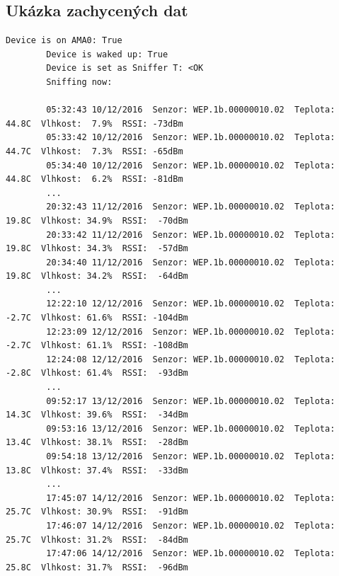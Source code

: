 \begin{landscape}
\chapter{Ukázka zachycených dat}
\label{PrilohaVystup}
	\begin{lstlisting}[style=MyCodeBash]
		Device is on AMA0: True
		Device is waked up: True
		Device is set as Sniffer T: <OK
		Sniffing now:

		05:32:43 10/12/2016  Senzor: WEP.1b.00000010.02  Teplota: 44.8C  Vlhkost:  7.9%  RSSI: -73dBm 
		05:33:42 10/12/2016  Senzor: WEP.1b.00000010.02  Teplota: 44.7C  Vlhkost:  7.3%  RSSI: -65dBm 
		05:34:40 10/12/2016  Senzor: WEP.1b.00000010.02  Teplota: 44.8C  Vlhkost:  6.2%  RSSI: -81dBm
		...
		20:32:43 11/12/2016  Senzor: WEP.1b.00000010.02  Teplota: 19.8C  Vlhkost: 34.9%  RSSI:  -70dBm
		20:33:42 11/12/2016  Senzor: WEP.1b.00000010.02  Teplota: 19.8C  Vlhkost: 34.3%  RSSI:  -57dBm
		20:34:40 11/12/2016  Senzor: WEP.1b.00000010.02  Teplota: 19.8C  Vlhkost: 34.2%  RSSI:  -64dBm
		...
		12:22:10 12/12/2016  Senzor: WEP.1b.00000010.02  Teplota: -2.7C  Vlhkost: 61.6%  RSSI: -104dBm
		12:23:09 12/12/2016  Senzor: WEP.1b.00000010.02  Teplota: -2.7C  Vlhkost: 61.1%  RSSI: -108dBm
		12:24:08 12/12/2016  Senzor: WEP.1b.00000010.02  Teplota: -2.8C  Vlhkost: 61.4%  RSSI:  -93dBm
		...
		09:52:17 13/12/2016  Senzor: WEP.1b.00000010.02  Teplota: 14.3C  Vlhkost: 39.6%  RSSI:  -34dBm
		09:53:16 13/12/2016  Senzor: WEP.1b.00000010.02  Teplota: 13.4C  Vlhkost: 38.1%  RSSI:  -28dBm 
		09:54:18 13/12/2016  Senzor: WEP.1b.00000010.02  Teplota: 13.8C  Vlhkost: 37.4%  RSSI:  -33dBm
		...
		17:45:07 14/12/2016  Senzor: WEP.1b.00000010.02  Teplota: 25.7C  Vlhkost: 30.9%  RSSI:  -91dBm
		17:46:07 14/12/2016  Senzor: WEP.1b.00000010.02  Teplota: 25.7C  Vlhkost: 31.2%  RSSI:  -84dBm
		17:47:06 14/12/2016  Senzor: WEP.1b.00000010.02  Teplota: 25.8C  Vlhkost: 31.7%  RSSI:  -96dBm
	\end{lstlisting}
\end{landscape}
	

